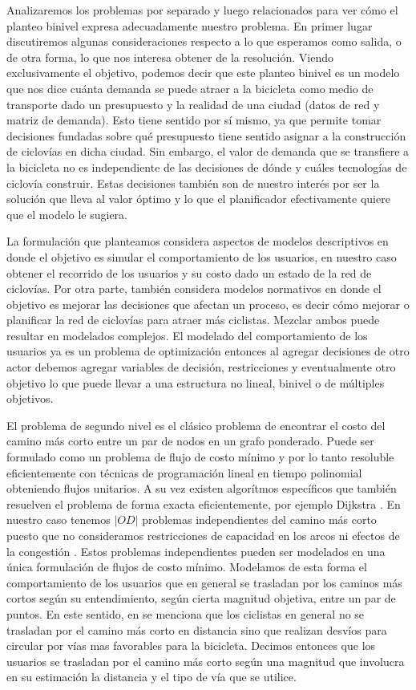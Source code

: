 Analizaremos los problemas por separado y luego relacionados para ver cómo el planteo binivel expresa adecuadamente nuestro problema. En primer lugar discutiremos algunas consideraciones respecto a lo que esperamos como salida, o de otra forma, lo que nos interesa obtener de la resolución. Viendo exclusivamente el objetivo, podemos decir que este planteo binivel es un modelo que nos dice cuánta demanda se puede atraer a la bicicleta como medio de transporte dado un presupuesto y la realidad de una ciudad (datos de red y matriz de demanda). Esto tiene sentido por sí mismo, ya que permite tomar decisiones fundadas sobre qué presupuesto tiene sentido asignar a la construcción de ciclovías en dicha ciudad. Sin embargo, el valor de demanda que se transfiere a la bicicleta no es independiente de las decisiones de dónde y cuáles tecnologías de ciclovía construir. Estas decisiones también son de nuestro interés por ser la solución que lleva al valor óptimo y lo que el planificador efectivamente quiere que el modelo le sugiera.

La formulación que planteamos considera aspectos de modelos descriptivos en donde el objetivo es simular el comportamiento de los usuarios, en nuestro caso obtener el recorrido de los usuarios y su costo dado un estado de la red de ciclovías. Por otra parte, también considera modelos normativos en donde el objetivo es mejorar las decisiones que afectan un proceso, es decir cómo mejorar o planificar la red de ciclovías para atraer más ciclistas. Mezclar ambos puede resultar en modelados complejos. El modelado del comportamiento de los usuarios ya es un problema de optimización entonces al agregar decisiones de otro actor debemos agregar variables de decisión, restricciones y eventualmente otro objetivo lo que puede llevar a una estructura no lineal, binivel o de múltiples objetivos.

El problema de segundo nivel es el clásico problema de encontrar el costo del camino más corto entre un par de nodos en un grafo ponderado. Puede ser formulado como un problema de flujo de costo mínimo y por lo tanto resoluble eficientemente con técnicas de programación lineal en tiempo polinomial obteniendo flujos unitarios. A su vez existen algorítmos específicos que también resuelven el problema de forma exacta eficientemente, por ejemplo Dijkstra \parencite{networkflowsbook}. En nuestro caso tenemos $|OD|$ problemas independientes del camino más corto puesto que no consideramos restricciones de capacidad en los arcos ni efectos de la congestión \parencite{Sheffi1985}. Estos problemas independientes pueden ser modelados en una única formulación de flujos de costo mínimo. Modelamos de esta forma el comportamiento de los usuarios que en general se trasladan por los caminos más cortos según su entendimiento, según cierta magnitud objetiva, entre un par de puntos. En este sentido, en \textcite{winters2010} se menciona que los ciclistas en general no se trasladan por el camino más corto en distancia sino que realizan desvíos para circular por vías mas favorables para la bicicleta. Decimos entonces que los usuarios se trasladan por el camino más corto según una magnitud que involucra en su estimación la distancia y el tipo de vía que se utilice.

